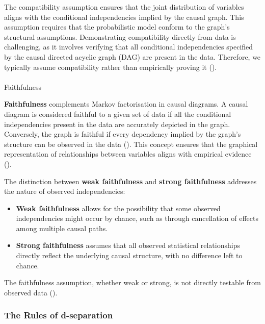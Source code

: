 \documentclass[
  single column]{article}
\makeatletter
\let\oldparagraph\paragraph
\renewcommand{\paragraph}{
    \@ifstar
      \xxxParagraphStar
      \xxxParagraphNoStar
  }
\newcommand{\xxxParagraphStar}[1]{\oldparagraph*{#1}\mbox{}}
\newcommand{\xxxParagraphNoStar}[1]{\oldparagraph{#1}\mbox{}}
\makeatother
\begin{document}
The compatibility assumption ensures that the joint distribution of
variables aligns with the conditional independencies implied by the
causal graph. This assumption requires that the probabilistic model
conform to the graph's structural assumptions. Demonstrating
compatibility directly from data is challenging, as it involves
verifying that all conditional independencies specified by the causal
directed acyclic graph (DAG) are present in the data. Therefore, we
typically assume compatibility rather than empirically proving it
().

\paragraph{Faithfulness}\label{faithfulness}

\textbf{Faithfulness} complements Markov factorisation in causal
diagrams. A causal diagram is considered faithful to a given set of data
if all the conditional independencies present in the data are accurately
depicted in the graph. Conversely, the graph is faithful if every
dependency implied by the graph's structure can be observed in the data
(). This concept
ensures that the graphical representation of relationships between
variables aligns with empirical evidence
().

The distinction between \textbf{weak faithfulness} and \textbf{strong
faithfulness} addresses the nature of observed independencies:

\begin{itemize}
\item
  \textbf{Weak faithfulness} allows for the possibility that some
  observed independencies might occur by chance, such as through
  cancellation of effects among multiple causal paths.
\item
  \textbf{Strong faithfulness} assumes that all observed statistical
  relationships directly reflect the underlying causal structure, with
  no difference left to chance.
\end{itemize}

The faithfulness assumption, whether weak or strong, is not directly
testable from observed data ().

\subsubsection{The Rules of
d-separation}\label{the-rules-of-d-separation}
\end{document}

